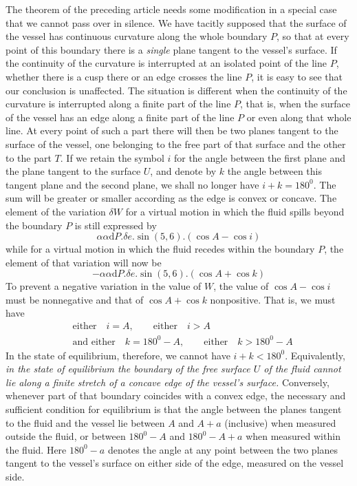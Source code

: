 The theorem of the preceding article needs some modification in a special case that we cannot pass over in silence. We have tacitly supposed that the surface of the vessel has continuous curvature along the whole boundary $P$, so that at every point of this boundary there is a \textit{single} plane tangent to the vessel’s surface. If the continuity of the curvature is interrupted at an isolated point of the line $P$, whether there is a cusp there or an edge crosses the line $P$, it is easy to see that our conclusion is unaffected. The situation is different when the continuity of the curvature is interrupted along a finite part of the line $P$, that is, when the surface of the vessel has an edge along a finite part of the line $P$ or even along that whole line. At every point of such a part there will then be two planes
tangent to the surface of the vessel, one belonging to the free part of that surface and the other to the part $T$. If we retain the symbol $i$ for the angle between the first plane and the plane tangent to the surface $U$, and denote by $k$ the angle between this tangent plane and the second plane, we shall no longer have $i+k=180^0$. The sum will be greater or smaller according as the edge is convex or concave. The element of the variation $\delta W$ for a virtual motion in which the fluid spills beyond the boundary $P$ is still expressed by
\[
\alpha\alpha\mathrm{d}P.\delta e.\sin(5,6).(\cos A-\cos i)
\]
while for a virtual motion in which the fluid recedes within the boundary $P$, the element of that variation will now be
\[
-\alpha\alpha\mathrm{d}P.\delta e.\sin(5,6).(\cos A+\cos k)
\]
To prevent a negative variation in the value of $W$, the value of $\cos A-\cos i$ must be nonnegative and that of $\cos A+\cos k$ nonpositive. That is, we must have
\[
\begin{aligned}
&\text{either}\quad i=A,\qquad\text{either}\quad i>A\\
&\text{and either}\quad k=180^0-A,\qquad\text{either}\quad k>180^0-A
\end{aligned}
\]
In the state of equilibrium, therefore, we cannot have $i+k<180^0$. Equivalently, \textit{in the state of equilibrium the boundary of the free surface $U$ of the fluid cannot lie along a finite stretch of a concave edge of the vessel’s surface.} Conversely, whenever part of that boundary coincides with a convex edge, the necessary and sufficient condition for equilibrium is that the angle between the planes tangent to the fluid and the vessel lie between $A$ and $A+a$ (inclusive) when measured outside the fluid, or between $180^0-A$ and $180^0-A+a$ when measured within the fluid. Here $180^0-a$ denotes the angle at any point between the two planes tangent to the vessel’s surface on either side of the edge, measured on the vessel side.

